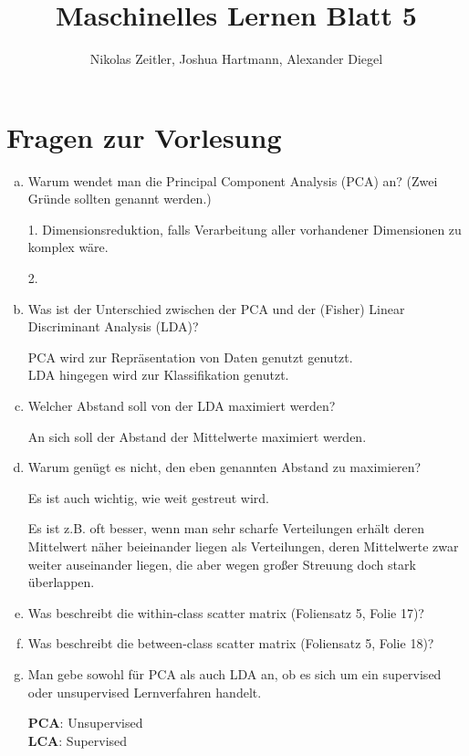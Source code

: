 \documentclass[a4paper]{scrartcl}
\author{Nikolas Zeitler, Joshua Hartmann, Alexander Diegel}
\title{Maschinelles Lernen Blatt 5}
\begin{document}
\maketitle
\section{Fragen zur Vorlesung}

\begin{enumerate}[a)]
	\item Warum wendet man die Principal Component Analysis (PCA) an? (Zwei Gründe sollten genannt werden.)
	
	1. Dimensionsreduktion, falls Verarbeitung aller vorhandener Dimensionen zu komplex wäre.
	
	2. 
	
	\item Was ist der Unterschied zwischen der PCA und der (Fisher) Linear Discriminant Analysis (LDA)?
	
	PCA wird zur Repräsentation von Daten genutzt genutzt.\\
	LDA hingegen wird zur Klassifikation genutzt.
	
	\item Welcher Abstand soll von der LDA maximiert werden?
	
	An sich soll der Abstand der Mittelwerte maximiert werden.
	
	\item Warum genügt es nicht, den eben genannten Abstand zu maximieren?
	
	Es ist auch wichtig, wie weit gestreut wird.
	
	Es ist z.B.  oft besser, wenn man sehr scharfe Verteilungen erhält deren Mittelwert näher beieinander liegen als Verteilungen, deren Mittelwerte zwar weiter auseinander liegen, die aber wegen großer Streuung doch stark überlappen.
	
	\item Was beschreibt die within-class scatter matrix (Foliensatz 5, Folie 17)?
	
	\item Was beschreibt die between-class scatter matrix (Foliensatz 5, Folie 18)?
	
	\item Man gebe sowohl für PCA als auch LDA an, ob es sich um ein supervised oder unsupervised Lernverfahren
	handelt.
	
	\textbf{PCA}: Unsupervised\\
	\textbf{LCA}: Supervised
	
\end{enumerate}
\end{document}

